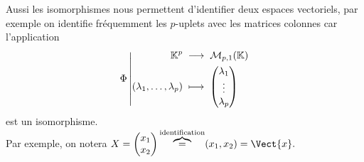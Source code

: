 \documentclass{book}
\begin{document}
\begin{Texte}
\begin{center}
\begin{Figure}
\begin{tikzpicture}
\end{tikzpicture}
\end{Figure}
\end{center}
Aussi les isomorphismes nous permettent d'identifier deux espaces vectoriels, par exemple on identifie fréquemment les $p$-uplets avec les matrices colonnes 
car l'application
\[ \Fonction{\Phi }{\K ^p}{\M{p}{1}{\K}}{(\lambda_1,\dots,\lambda_p)}{\begin{pmatrix}\lambda_1\\\vdots\\\lambda_p\end{pmatrix}} \]
est un isomorphisme.\\
Par exemple, on notera $X=\begin{pmatrix}x_1\\x_2\\\end{pmatrix}\overbrace{=}^{\text{identification}}(x_1,x_2)=\Vect{x}.$
\end{Texte}
\end{document}
